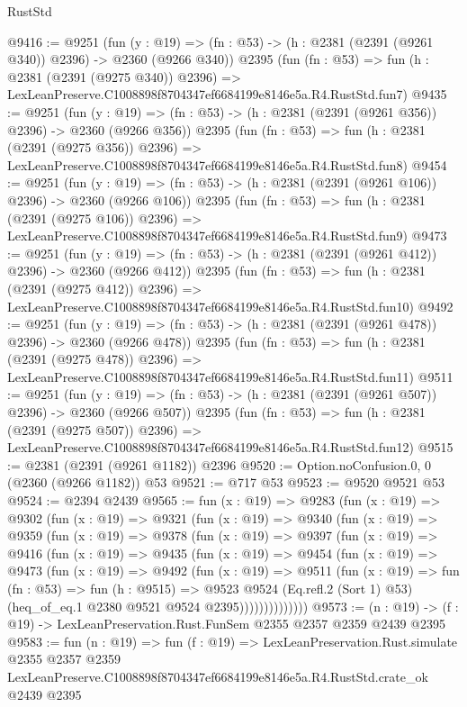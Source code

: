\begin{lexlean}{RustStd}
\begin{coremodule}
@9416 := @9251
    (fun (y : @19) => (fn : @53) -> (h : @2381 (@2391 (@9261 @340)) @2396) -> @2360 (@9266 @340))
    @2395
    (fun (fn : @53) =>
    fun (h : @2381 (@2391 (@9275 @340)) @2396) =>
    LexLeanPreserve.C1008898f8704347ef6684199e8146e5a.R4.RustStd.fun7)
@9435 := @9251
    (fun (y : @19) => (fn : @53) -> (h : @2381 (@2391 (@9261 @356)) @2396) -> @2360 (@9266 @356))
    @2395
    (fun (fn : @53) =>
    fun (h : @2381 (@2391 (@9275 @356)) @2396) =>
    LexLeanPreserve.C1008898f8704347ef6684199e8146e5a.R4.RustStd.fun8)
@9454 := @9251
    (fun (y : @19) => (fn : @53) -> (h : @2381 (@2391 (@9261 @106)) @2396) -> @2360 (@9266 @106))
    @2395
    (fun (fn : @53) =>
    fun (h : @2381 (@2391 (@9275 @106)) @2396) =>
    LexLeanPreserve.C1008898f8704347ef6684199e8146e5a.R4.RustStd.fun9)
@9473 := @9251
    (fun (y : @19) => (fn : @53) -> (h : @2381 (@2391 (@9261 @412)) @2396) -> @2360 (@9266 @412))
    @2395
    (fun (fn : @53) =>
    fun (h : @2381 (@2391 (@9275 @412)) @2396) =>
    LexLeanPreserve.C1008898f8704347ef6684199e8146e5a.R4.RustStd.fun10)
@9492 := @9251
    (fun (y : @19) => (fn : @53) -> (h : @2381 (@2391 (@9261 @478)) @2396) -> @2360 (@9266 @478))
    @2395
    (fun (fn : @53) =>
    fun (h : @2381 (@2391 (@9275 @478)) @2396) =>
    LexLeanPreserve.C1008898f8704347ef6684199e8146e5a.R4.RustStd.fun11)
@9511 := @9251
    (fun (y : @19) => (fn : @53) -> (h : @2381 (@2391 (@9261 @507)) @2396) -> @2360 (@9266 @507))
    @2395
    (fun (fn : @53) =>
    fun (h : @2381 (@2391 (@9275 @507)) @2396) =>
    LexLeanPreserve.C1008898f8704347ef6684199e8146e5a.R4.RustStd.fun12)
@9515 := @2381 (@2391 (@9261 @1182)) @2396
@9520 := Option.noConfusion.{0, 0} (@2360 (@9266 @1182)) @53
@9521 := @717 @53
@9523 := @9520 @9521 @53
@9524 := @2394 @2439
@9565 := fun (x : @19) =>
  @9283
    (fun (x : @19) =>
    @9302
      (fun (x : @19) =>
      @9321
        (fun (x : @19) =>
        @9340
          (fun (x : @19) =>
          @9359
            (fun (x : @19) =>
            @9378
              (fun (x : @19) =>
              @9397
                (fun (x : @19) =>
                @9416
                  (fun (x : @19) =>
                  @9435
                    (fun (x : @19) =>
                    @9454
                      (fun (x : @19) =>
                      @9473
                        (fun (x : @19) =>
                        @9492
                          (fun (x : @19) =>
                          @9511
                            (fun (x : @19) =>
                            fun (fn : @53) =>
                            fun (h : @9515) =>
                            @9523
                              @9524
                              (Eq.refl.{2} (Sort 1) @53)
                              (heq_of_eq.{1} @2380 @9521 @9524 @2395))))))))))))))
@9573 := (n : @19) -> (f : @19) -> LexLeanPreservation.Rust.FunSem @2355 @2357 @2359 @2439 @2395
@9583 := fun (n : @19) =>
  fun (f : @19) =>
  LexLeanPreservation.Rust.simulate
    @2355
    @2357
    @2359
    LexLeanPreserve.C1008898f8704347ef6684199e8146e5a.R4.RustStd.crate_ok
    @2439
    @2395
\end{coremodule}
\end{lexlean}
